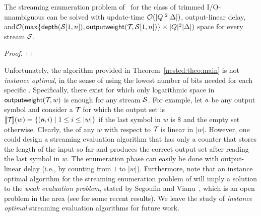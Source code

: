 \begin{proposition} \label{nested:prop:space}
	The streaming enumeration problem of \enumvpann\ for the class of trimmed I/O-unambiguous \vpann can be solved with update-time $\mathcal{O}(|Q|^2\vert\Delta\vert)$, output-linear delay,  and\linebreak $\mathcal{O}(\max\{\mathsf{depth}(\mathcal{S}[1, n]), \mathsf{outputweight}(\mathcal{T}\!,\mathcal{S}[1, n])\}\times|Q|^2|\Delta|)$ space for every stream $\mathcal{S}$.
\end{proposition} 
\begin{proof}
	
\end{proof}


Unfortunately, the algorithm provided in Theorem~\ref{nested:theo:main} is not \emph{instance optimal}, in the sense of using the lowest number of bits needed for each specific \vpann. 
Specifically, there exist \vpanns for which only logarithmic space in $\mathsf{outputweight}(\mathcal{T}\!,w)$ is enough for any stream $\mathcal{S}$. For example, let $\oout$ be any output symbol and consider a \vpann $\mathcal{T}\!$ for which the output set is $\sem{\cT}(w)  = \{(\oout, i)\mid 1\leq i\leq \vert w \vert \}$ if the last symbol in $w$ is $\$$ and the empty set otherwise. Clearly, the \ogapname of any $w$ with respect to $\mathcal{T}\!$ is linear in $\vert w\vert$. However, one could design a streaming evaluation algorithm that has only a counter that stores the length of the input so far and produces the correct output set after reading the last symbol in $w$. The enumeration phase can easily be done with output-linear delay (i.e., by counting from $1$ to $\vert w\vert$). 
Furthermore, note that an instance optimal algorithm for the streaming enumeration problem of \vpanns will imply a solution to the \emph{weak evaluation problem}, stated by Segoufin and Vianu~\cite{SegoufinV02}, which is an open problem in the area (see \cite{Barloy21} for some recent results). We leave the study of \emph{instance optimal} streaming evaluation algorithms for future work. 
